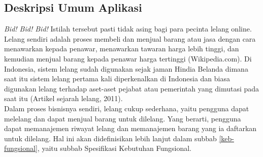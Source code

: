 \subsection{Deskripsi Umum Aplikasi}
	\label{deskripsi-umum-app}

	\textit{Bid! Bid! Bid!} Istilah tersebut pasti tidak asing bagi para pecinta lelang online. Lelang sendiri adalah proses membeli dan menjual barang atau jasa dengan cara menawarkan kepada penawar, menawarkan tawaran harga lebih tinggi, dan kemudian menjual barang kepada penawar harga tertinggi (Wikipedia.com).  Di Indonesia, sistem lelang sudah digunakan sejak jaman Hindia Belanda dimana saat itu sistem lelang pertama kali diperkenalkan di Indonesia dan biasa digunakan lelang terhadap aset-aset pejabat atau pemerintah yang dimutasi pada saat itu (Artikel sejarah lelang, 2011). \\	 
	
	\indent Dalam proses bisnisnya sendiri, lelang cukup sederhana, yaitu pengguna dapat melelang dan dapat menjual barang untuk dilelang. Yang berarti, pengguna dapat memanajemen riwayat lelang dan memanajemen barang yang ia daftarkan untuk dilelang. Hal ini akan didefinisikan lebih lanjut dalam subbab \ref{keb-fungsional}, yaitu subbab Spesifikasi Kebutuhan Fungsional.
